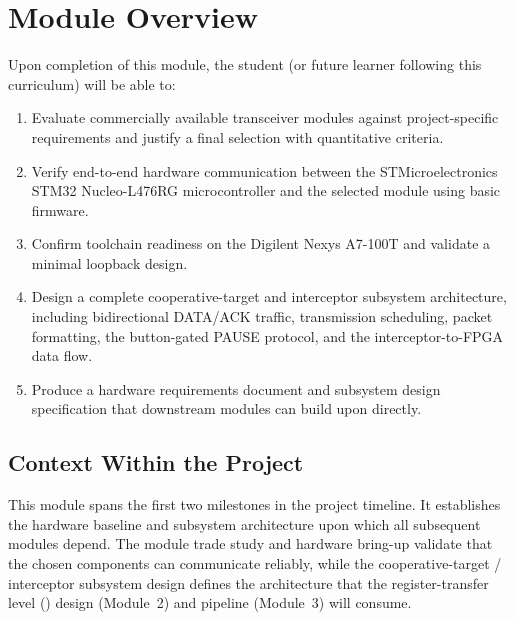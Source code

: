 \documentclass[11pt,letterpaper]{article}
\begin{document}
	\tableofcontents
	\newpage
	
	\section{Module Overview}
	
	\begin{tcolorbox}[objective={Module 1 Learning Objectives}]
		Upon completion of this module, the student (or future learner following this curriculum) will be able to:
		\begin{enumerate}[label=\textbf{LO-\arabic*}]
			\item Evaluate commercially available \RF{} transceiver modules against project-specific requirements and justify a final selection with quantitative criteria.
			\item Verify end-to-end hardware communication between the STMicroelectronics STM32 Nucleo-L476RG microcontroller and the selected \RF{} module using basic firmware.
			\item Confirm \FPGA{} toolchain readiness on the Digilent Nexys A7-100T and validate a minimal loopback design.
			\item Design a complete \RF{} cooperative-target and interceptor subsystem architecture, including bidirectional DATA/ACK traffic, transmission scheduling, packet formatting, the button-gated PAUSE protocol, and the interceptor-to-FPGA data flow.
			\item Produce a hardware requirements document and subsystem design specification that downstream modules can build upon directly.
		\end{enumerate}
	\end{tcolorbox}
	
	\subsection{Context Within the Project}
	
	This module spans the first two milestones in the project timeline. It establishes the hardware baseline and subsystem architecture upon which all subsequent modules depend. The \RF{} module trade study and hardware bring-up validate that the chosen components can communicate reliably, while the cooperative-target / interceptor subsystem design defines the architecture that the \FPGA{} register-transfer level (\RTL{}) design (Module~2) and \ML{} pipeline (Module~3) will consume.
	
\end{document}
